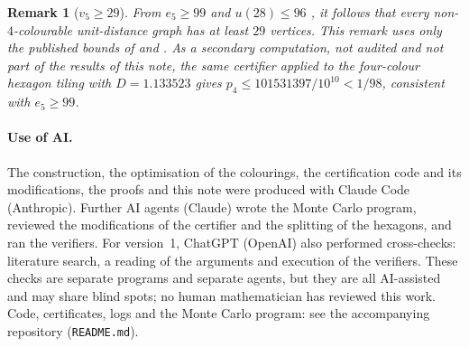 \documentclass[10pt,a4paper]{article}
\newtheorem*{remark}{Remark}
\begin{document}
\begin{remark}[$v_5\ge29$]
From $e_5\ge99$ \cite{dGP} and $u(28)\le96$ \cite[Thm.~1(b)]{AMP}, it follows that every
non-$4$-colourable unit-distance graph has at least $29$ vertices. This remark uses only the published
bounds of \cite{dGP} and \cite{AMP}. As a secondary computation, not audited and not part of the
results of this note, the same certifier applied to the four-colour hexagon tiling with $D=1.133523$
gives $p_4\le101531397/10^{10}<1/98$, consistent with $e_5\ge99$.
\end{remark}

\paragraph{Use of AI.} The construction, the optimisation of the colourings, the certification
code and its modifications, the proofs and this note were produced with Claude Code (Anthropic). Further AI
agents (Claude) wrote the Monte Carlo program, reviewed the modifications of the certifier and the splitting
of the hexagons, and ran the verifiers. For version~1, ChatGPT (OpenAI) also performed cross-checks:
literature search, a reading of the arguments and execution of the verifiers. These checks are separate
programs and separate agents, but they are all AI-assisted and may share blind spots; no human mathematician
has reviewed this work. Code, certificates, logs and the Monte Carlo program: see the accompanying repository
(\texttt{README.md}).
\end{document}
